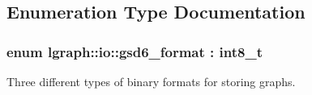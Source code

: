 \subsection{Enumeration Type Documentation}
\hypertarget{namespacelgraph_1_1io_ad0917668d35430ffe13d455d687be4ff}{
\subsubsection[{gsd6\-\_\-format}]{\setlength{\rightskip}{0pt plus 5cm}enum {\bf lgraph\-::io\-::gsd6\-\_\-format} \-: int8\-\_\-t\hspace{0.3cm}{\ttfamily [strong]}}}\label{namespacelgraph_1_1io_ad0917668d35430ffe13d455d687be4ff}


Three different types of binary formats for storing graphs. 

